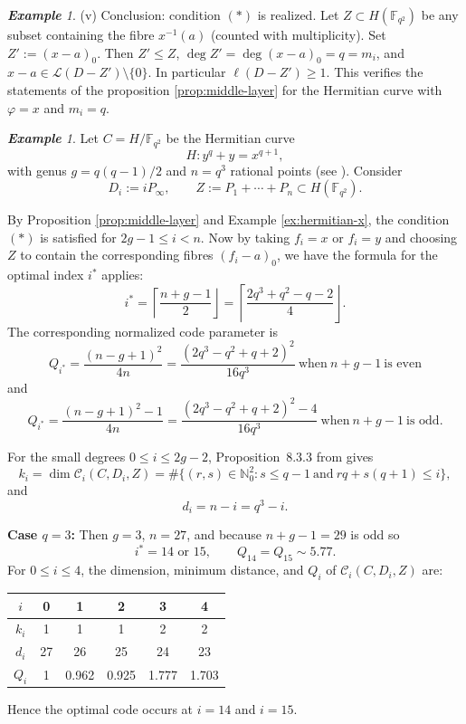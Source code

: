 \documentclass[14pt]{amsart}
\theoremstyle{plain}
\theoremstyle{definition}
\theoremstyle{remark}
\newtheorem{exam}[thm]{\bf Example}
\theoremstyle{example}
\def \F{\mathbb{F}}
\def \N{\mathbb{N}}
\def \C{\mathcal{C}}
\begin{document}
\begin{exam}
\medskip\noindent (v) Conclusion: condition $(*)$ is realized.
Let $Z\subset H(\F_{q^2})$ be any subset containing the fibre $x^{-1}(a)$
(counted with multiplicity). Set $Z':=(x-a)_0$. Then $Z'\le Z$,
$\deg Z'=\deg (x-a)_0=q=m_i$, and $x-a\in\mathcal L(D-Z')\setminus\{0\}$. In
particular $\ell(D-Z')\ge 1$. This verifies the statements of the
proposition \ref{prop:middle-layer} for the Hermitian curve with $\varphi=x$ and $m_i=q$.
\end{exam}

\begin{exam} %
Let $C=H/\F_{q^2}$ be the Hermitian curve
$$
H:  y^q+y = x^{q+1},
$$
with genus $g=q(q-1)/2$ and $n=q^3$ rational points (see \cite{St}). Consider
$$
D_i := i P_\infty, \qquad Z := P_1 + \cdots + P_n \subset H(\F_{q^2}).
$$

By Proposition \ref{prop:middle-layer} and Example \ref{ex:hermitian-x}, the condition $(*)$ is satisfied for $2g-1 \le i < n$. Now by taking $f_i = x$ or $f_i = y$ and choosing $Z$ to contain the corresponding fibres $(f_i-a)_0$, we have the formula for the optimal index $i^*$ applies:
$$
i^* = \left\lceil \frac{n+g-1}{2} \right\rfloor = \left\lceil \frac{2q^3 + q^2 - q - 2}{4} \right\rfloor.
$$
The corresponding normalized code parameter is
$$
Q_{i^*} = \frac{(n-g+1)^2}{4n} = \frac{(2q^3 - q^2 + q + 2)^2}{16 q^3}\ \text{when}\ n+g-1\ \text{is even}
$$
and
$$
Q_{i^*} = \frac{(n-g+1)^2-1}{4n} = \frac{(2q^3 - q^2 + q + 2)^2-4}{16 q^3}\ \text{when}\ n+g-1\ \text{is odd}.
$$

For the small degrees $0 \le i \le 2g-2$, Proposition~8.3.3 from \cite{St} gives
$$
k_i = \dim \C_i(C,D_i,Z) = \# \{(r,s) \in \N_0^2 : s \le q-1 \ \text{and}\ r q + s(q+1) \le i \},
$$
and
$$
d_i = n - i = q^3 - i.
$$

\medskip\noindent
\textbf{Case $q=3$:} Then $g=3$, $n=27$, and because $n+g-1=29$ is odd so
$$
i^* = 14 \text{ or } 15, \qquad Q_{14} = Q_{15} \sim 5.77.
$$ 
For $0\le i \le 4$, the dimension, minimum distance, and $Q_i$ of $\C_i(C,D_i,Z)$ are:

{\tiny
\begin{center}
\begin{tabular}{c | c c c c c}			
  $i$ & 0 & 1 & 2 & 3 & 4 \\
  \hline
  $k_i$ & 1 & 1 & 1 & 2 & 2 \\
  $d_i$ & 27 & 26 & 25 & 24 & 23 \\
  $Q_i$ & 1 & 0.962 & 0.925 & 1.777 & 1.703 \\
\end{tabular}
\end{center}
}
Hence the optimal code occurs at $i=14$ and $i=15$.


\end{exam}
\end{document}
